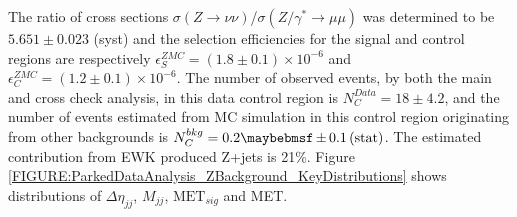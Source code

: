 The ratio of cross sections $\sigma(Z\rightarrow\nu\nu)$/$\sigma(Z/\gamma^{*}\rightarrow\mu\mu)$ was determined to be $5.651\pm 0.023$ (syst) and the selection efficiencies for the signal and control regions are respectively $\epsilon_{S}^{ZMC}=(1.8\pm 0.1) \times 10^{-6}$ and $\epsilon_{C}^{ZMC}=(1.2\pm 0.1) \times 10^{-6}$. The number of observed events, by both the main and cross check analysis, in this data control region is $N_{C}^{Data}=18\pm 4.2$, and the number of events estimated from \gls{MC} simulation in this control region originating from other backgrounds is $N_{C}^{bkg}=0.2 \pm 0.1 \stat$. The estimated contribution from \gls{EWK} produced Z+jets is 21\%. Figure \ref{FIGURE:ParkedDataAnalysis_ZBackground_KeyDistributions} shows distributions of $\Delta\eta_{jj}$, $M_{jj}$, $\text{MET}_{sig}$ and \gls{MET}.

